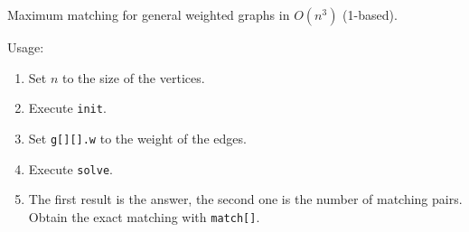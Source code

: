 Maximum matching for general weighted graphs in $O(n^3)$ (1-based).

Usage: 
\begin{enumerate}
\item Set $n$ to the size of the vertices.
\item Execute \texttt{init}.
\item Set \texttt{g[][].w} to the weight of the edges.
\item Execute \texttt{solve}.
\item The first result is the answer, the second one is the number of matching pairs. Obtain the exact matching with \texttt{match[]}.
\end{enumerate}


